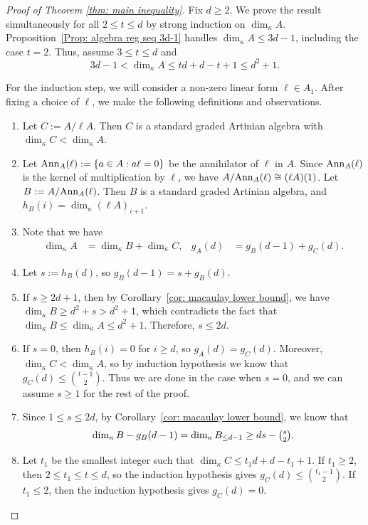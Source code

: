 \documentclass[11pt]{amsart}
\theoremstyle{definition}
\newcommand{\dimk}{\dim_{\kappa}}
\newcommand{\Ann}{{\rm Ann}}
\begin{document}
\begin{proof}[Proof of Theorem \ref{thm: main inequality}]
Fix $d\geq2$. We prove the result simultaneously for all
$2\leq t\leq d$ by strong induction on $\dim_\kappa A$.
Proposition~\ref{Prop: algebra reg seq 3d-1} handles
$\dim_\kappa A\leq3d-1$, including the case $t=2$.
Thus, assume $3\leq t\leq d$ and
\[
3d-1<\dim_\kappa A\leq td+d-t+1\leq d^2+1.
\]

For the induction step, we will consider a non-zero linear form $\ell\in A_1$. After fixing a choice of $\ell$, we make the following definitions and observations.
\begin{enumerate}
\item Let $C:= A/\ell A$. Then $C$ is a standard graded Artinian algebra with $\dimk C < \dimk A$.

\item Let $\Ann_A(\ell):=\{a \in A: a\ell=0\}$ be the annihilator of $\ell$ in $A$. Since $\Ann_A(\ell)$ is the kernel of multiplication by $\ell$, we have $A/\Ann_A(\ell) \cong (\ell A)(1)$.
Let $B:=A/\Ann_A(\ell)$. Then $B$ is a standard graded Artinian algebra, and $h_B(i)=\dimk (\ell A)_{i+1}$.

\item Note that we have
\begin{align*}
\dimk A &= \dimk B + \dimk C,
&
g_A(d) &= g_B(d-1) +g_C(d).
\end{align*}

\item Let $s:=h_B(d)$, so $g_B(d-1) = s+g_B(d)$.

\item If $s \geq 2d+1$, then by Corollary~\ref{cor: macaulay lower bound}, we have $\dimk B \geq d^2+s>d^2+1$, which contradicts the fact that $\dimk B \leq \dimk A \leq d^2+1$. Therefore, $s\leq 2d$.

\item If $s=0$, then $h_B(i)=0$ for $i \geq d$, so $g_A(d) = g_C(d)$. Moreover, $\dimk C<\dimk A$, so by induction hypothesis we know that $g_C(d)\leq \binom{t-1}{2}$. Thus we are done in the case when $s=0$, and we can assume $s\geq 1$ for the rest of the proof.

\item Since $1\leq s\leq 2d$, by Corollary~\ref{cor: macaulay lower bound}, we know that
\[
\dimk B - g_B(d-1)
= \dimk B_{\le d-1} 
\geq ds-\tbinom{s}{2}.
\] 

\item Let $t_1$ be the smallest integer such that $\dimk C\leq t_1d+d-t_1+1$. 
If $t_1\geq2$, then $2\leq t_1\leq t\leq d$,
so the induction hypothesis gives
$g_C(d)\leq\binom{t_1-1}{2}$.
If $t_1\leq 2$, then the induction hypothesis gives $g_C(d)=0$.



\end{enumerate}
\end{proof}
\end{document}
